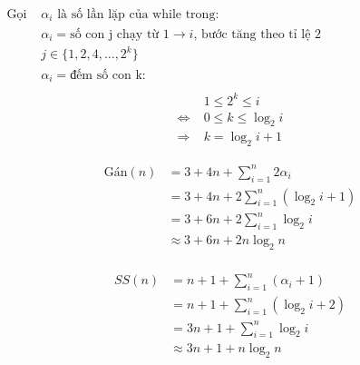 \documentclass[12pt, letterpaper]{article}
\begin{document}
$ \begin{aligned}
		\text{Gọi } & \alpha_i \text{ là số lần lặp của while trong:}                              \\
		            & \alpha_i = \text{số con j chạy từ 1} \rightarrow i \text{, bước tăng theo tỉ lệ 2} \\
                    & j \in \{ 1, 2, 4, \ldots, 2^k \} \\
		            & \alpha_i = \text{đếm số con k:} \\
	\end{aligned} $ \\

\begin{align*}
    & 1 \leq 2^k \leq i \\
    \Leftrightarrow\; & 0 \leq k \leq \log_2{i} \\
    \Rightarrow\; & k = \log_2{i} + 1
\end{align*}

\begin{align*}
    \text{Gán}(n) & = 3 + 4n + \sum^{n}_{i = 1} 2 \alpha_i \\
                  & = 3 + 4n + 2 \sum^{n}_{i = 1} (\log_2{i} + 1) \\
                  & = 3 + 6n + 2 \sum^{n}_{i = 1} \log_2{i} \\
                  & \approx 3 + 6n + 2 n \log_2{n} \\
\end{align*}

\begin{align*}
	SS(n) & = n + 1 + \sum^{n}_{i = 1} (\alpha_i + 1)           \\
          & = n + 1 + \sum^{n}_{i = 1} (\log_2{i} + 2)           \\
          & = 3n + 1 + \sum^{n}_{i = 1} \log_2{i}           \\
          & \approx 3n + 1 + n \log_2{n}           \\
\end{align*}


\end{document}
